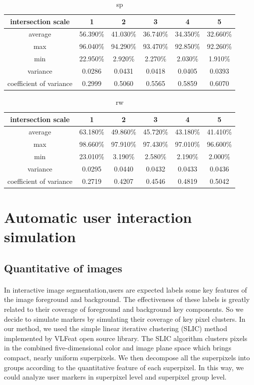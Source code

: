 \documentclass[runningheads,a4paper]{llncs}
\begin{document}
\begin{table}
\centering
\begin{tabular}{|c|c|c|c|c|c|}
\hline
intersection scale & 1 & 2 & 3 & 4& 5 \\
\hline
average& 56.390\% & 41.030\% & 36.740\% & 34.350\%& 32.660\% \\
\hline
max& 96.040\% & 94.290\% & 93.470\% & 92.850\%& 92.260\% \\
\hline
min& 22.950\% & 2.920\% & 2.270\% & 2.030\%& 1.910\%\\
\hline
variance& 0.0286 & 0.0431 & 0.0418& 0.0405&0.0393 \\
\hline
coefficient of variance& 0.2999 & 0.5060 & 0.5565 & 0.5859& 0.6070\\
\hline
\end{tabular}
\caption{sp}
\end{table} 

\begin{table}
\centering
\begin{tabular}{|c|c|c|c|c|c|}
\hline
intersection scale & 1 & 2 & 3 & 4& 5 \\
\hline
average& 63.180\% & 49.860\% & 45.720\% & 43.180\%& 41.410\% \\
\hline
max& 98.660\% & 97.910\% & 97.430\% & 97.010\%& 96.600\% \\
\hline
min& 23.010\% & 3.190\% & 2.580\% & 2.190\%& 2.000\%\\
\hline
variance& 0.0295 & 0.0440 & 0.0432 & 0.0433& 0.0436 \\
\hline
coefficient of variance& 0.2719 & 0.4207 & 0.4546 & 0.4819& 0.5042\\
\hline
\end{tabular}
\caption{rw}
\end{table} 



\section{Automatic user interaction simulation}
\subsection{Quantitative of images}
\paragraph{} In interactive image segmentation,users are expected labels some key features of the image foreground and background. The effectiveness of these labels is greatly related to their coverage of foreground and background key components. So we decide to simulate markers by simulating their coverage of key pixel clusters. In our method, we used the simple linear iterative clustering (SLIC)  method \citep{achanta2010slic} implemented by VLFeat open source library\citep{vedaldi08vlfeat}. The SLIC algorithm clusters pixels in the combined five-dimensional color and image plane space which brings compact, nearly uniform superpixels. We then decompose all the superpixels into groups according to the quantitative feature of each superpixel. In this way, we could analyze user markers in superpixel level and superpixel group level.
\end{document}
